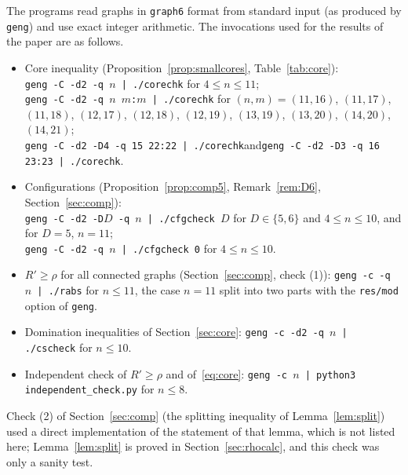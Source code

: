 \documentclass[11pt]{amsart}
\theoremstyle{definition}
\newcommand{\Rp}{R'}
\begin{document}
The programs read graphs in \texttt{graph6} format from standard input (as produced by \texttt{geng}) and use exact
integer arithmetic. The invocations used for the results of the paper are as follows.
\begin{itemize}
\item Core inequality (Proposition~\ref{prop:smallcores}, Table~\ref{tab:core}):\\
      \texttt{geng -C -d2 -q $n$ | ./corechk} for $4\le n\le11$;\\
      \texttt{geng -C -d2 -q $n$ $m$:$m$ | ./corechk} for $(n,m)=(11,16)$, $(11,17)$, $(11,18)$, $(12,17)$,
      $(12,18)$, $(12,19)$, $(13,19)$, $(13,20)$, $(14,20)$, $(14,21)$;\\
      \texttt{geng -C -d2 -D4 -q 15 22:22 | ./corechk}\quad and\quad \texttt{geng -C -d2 -D3 -q 16 23:23 | ./corechk}.
\item Configurations (Proposition~\ref{prop:comp5}, Remark~\ref{rem:D6}, Section~\ref{sec:comp}):\\
      \texttt{geng -C -d2 -D$D$ -q $n$ | ./cfgcheck $D$} for $D\in\{5,6\}$ and $4\le n\le10$, and for $D=5$, $n=11$;\\
      \texttt{geng -C -d2 -q $n$ | ./cfgcheck 0} for $4\le n\le10$.
\item $\Rp\ge\rho$ for all connected graphs (Section~\ref{sec:comp}, check (1)): \texttt{geng -c -q $n$ | ./rabs} for
      $n\le11$, the case $n=11$ split into two parts with the \texttt{res/mod} option of \texttt{geng}.
\item Domination inequalities of Section~\ref{sec:core}: \texttt{geng -c -d2 -q $n$ | ./cscheck} for $n\le10$.
\item Independent check of $\Rp\ge\rho$ and of~\eqref{eq:core}: \texttt{geng -c $n$ | python3 independent\_check.py}
      for $n\le8$.
\end{itemize}
Check (2) of Section~\ref{sec:comp} (the splitting inequality of Lemma~\ref{lem:split}) used a direct implementation of
the statement of that lemma, which is not listed here; Lemma~\ref{lem:split} is proved in Section~\ref{sec:rhocalc},
and this check was only a sanity test.
\end{document}
